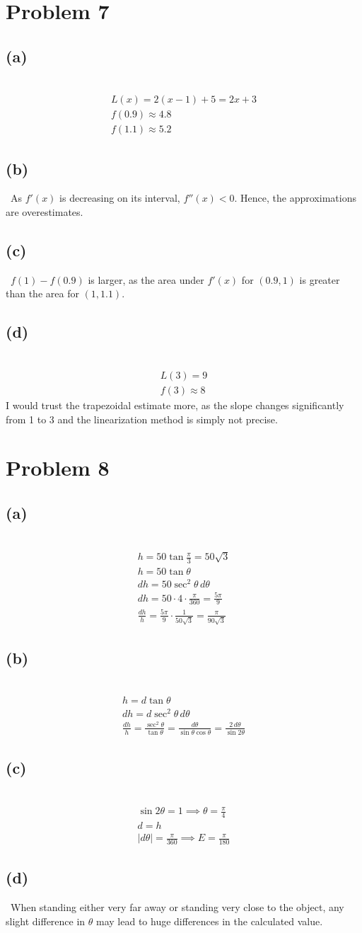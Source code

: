 \documentclass[12pt]{article}
\newcommand{\vem}{\vspace{0.5em}}
\newcommand{\problem}[1]{\section{Problem #1}}
\newcommand{\subproblem}[1]{\subsection{(#1)} \,}
\begin{document}
\problem{7}

\subproblem{a}
\begin{gather*}
    L(x)=2(x-1)+5=2x+3\\
    f(0.9)\approx \boxed{4.8}\\
    f(1.1)\approx \boxed{5.2}
\end{gather*}

\subproblem{b}
As $f'(x)$ is decreasing on its interval, $f''(x)<0$. Hence, the approximations are overestimates. \vem

\subproblem{c}
$f(1)-f(0.9)$ is larger, as the area under $f'(x)$ for $(0.9,1)$ is greater than the area for $(1,1.1)$.\vem

\subproblem{d}
\begin{gather*}
    L(3)=9\\
    f(3)\approx 8
\end{gather*}
I would trust the trapezoidal estimate more, as the slope changes significantly from 1 to 3 and the linearization method is simply not precise.

\problem{8}

\subproblem{a}
\begin{gather*}
    h=50\tan \frac{\pi}{3}=\boxed{50\sqrt{3}}\\
    h=50\tan \theta\\
    dh = 50 \sec^2 \theta \, d\theta \\
    dh=50\cdot 4\cdot \frac{\pi}{360}= \boxed{\frac{5\pi}{9}}\\
    \frac{dh}{h}=\frac{5\pi}{9} \cdot \frac{1}{50\sqrt{3}}=\boxed{\frac{\pi}{90\sqrt{3}}}
\end{gather*}

\subproblem{b}
\begin{gather*}
    h=d\tan \theta \\
    dh = d \sec^2 \theta \, d\theta \\
    \frac{dh}{h}=\frac{\sec^2\theta}{\tan \theta }=\frac{d\theta }{\sin \theta \cos \theta } =\boxed{\frac{2\,d\theta }{\sin 2\theta }}
\end{gather*}

\subproblem{c}
\begin{gather*}
    \sin 2\theta =1\implies \theta =\boxed{\frac{\pi}{4}}\\
    d=h\\
    |d\theta |=\frac{\pi}{360} \implies E=\boxed{\frac{\pi}{180}}
\end{gather*}

\subproblem{d}
When standing either very far away or standing very close to the object, any slight difference in $\theta $ may lead to huge differences in the calculated value.
\end{document}
